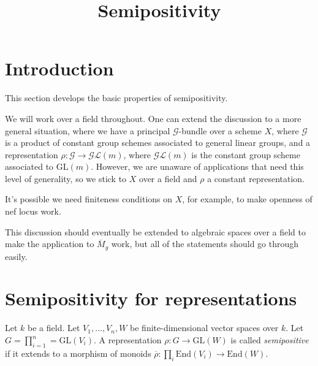 


\newcommand{\todo}[1]{\footnote{\textbf{TODO.} #1}}


\title{Semipositivity}
\maketitle

\section{Introduction}
This section develops the basic properties of semipositivity.

\begin{remark}
We will work over a field throughout.
One can extend the discussion to a more general situation, where we have a
principal $\mathcal{G}$-bundle over a scheme $X$, where $\mathcal{G}$ is a
product of constant group schemes associated to general linear groups, and a
representation $\rho:\mathcal{G}\to\mathcal{GL}(m)$, where $\mathcal{GL}(m)$ is
the constant group scheme associated to $\mathrm{GL}(m)$.
However, we are unaware of applications that need this level of generality, so
we stick to $X$ over a field and $\rho$ a constant representation.

It's possible we need finiteness conditions on $X$, for example, to make
openness of nef locus work.
\end{remark}

\begin{remark}
This discussion should eventually be extended to algebraic spaces over a field
to make the application to $\overline{M}_g$ work, but all of the statements
should go through easily.
\end{remark}

\section{Semipositivity for representations}

\begin{definition}\label{semipos_rep_def}
Let $k$ be a field.
Let $V_1,\ldots,V_n,W$ be finite-dimensional vector spaces over $k$.
Let $G=\prod_{i=1}^{n}=\mathrm{GL}(V_i)$.
A representation $\rho:G\rightarrow \mathrm{GL}(W)$ is called
\textit{semipositive} if it extends to a morphism of monoids
$\overline{\rho}:\prod_i \mathrm{End}(V_i)\rightarrow\mathrm{End}(W)$.
\end{definition}

